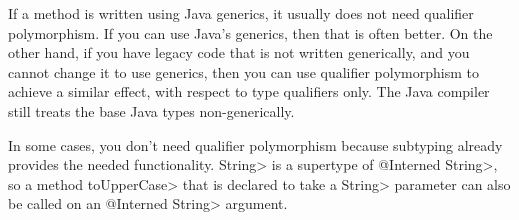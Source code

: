If a method is written using Java generics, it usually does not need
qualifier polymorphism.  If you can use Java's generics, then that is often
better.  On the other hand, if you have legacy code that is not
written generically, and you cannot change it to use generics, then you can
use qualifier polymorphism to achieve a similar effect, with respect to
type qualifiers only.  The Java compiler still treats the base Java types
non-generically.

In some cases, you don't need qualifier polymorphism because subtyping
already provides the needed functionality.
\<String> is a supertype of \<@Interned String>, so a method \<toUpperCase>
that is declared to take a \<String> parameter can also be called on an
\<@Interned String> argument.

%
%
%
%
%
%
%
%
